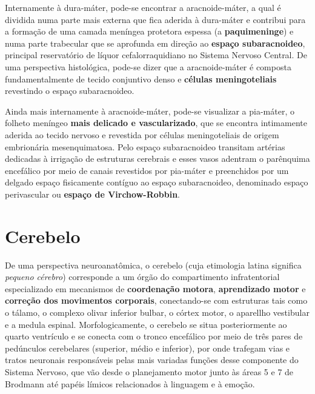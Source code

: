 \documentclass[
]{book}
\begin{document}
Internamente à dura-máter, pode-se encontrar a aracnoide-máter, a qual é dividida numa parte mais externa que fica aderida à dura-máter e contribui para a formação de uma camada meníngea protetora espessa (a \textbf{paquimeninge}) e numa parte trabecular que se aprofunda em direção ao \textbf{espaço subaracnoideo}, principal reservatório de líquor cefalorraquidiano no Sistema Nervoso Central. De uma perspectiva histológica, pode-se dizer que a aracnoide-máter é composta fundamentalmente de tecido conjuntivo denso e \textbf{células meningoteliais} revestindo o espaço subaracnoideo.

Ainda mais internamente à aracnoide-máter, pode-se visualizar a pia-máter, o folheto meníngeo \textbf{mais delicado e vascularizado}, que se encontra intimamente aderida ao tecido nervoso e revestida por células meningoteliais de origem embrionária mesenquimatosa. Pelo espaço subaracnoideo transitam artérias dedicadas à irrigação de estruturas cerebrais e esses vasos adentram o parênquima encefálico por meio de canais revestidos por pia-máter e preenchidos por um delgado espaço fisicamente contíguo ao espaço subaracnoideo, denominado espaço perivascular ou \textbf{espaço de Virchow-Robbin}.

\hypertarget{cerebelo}{%
\chapter{Cerebelo}\label{cerebelo}}

De uma perspectiva neuroanatômica, o cerebelo (cuja etimologia latina significa \emph{pequeno cérebro}) corresponde a um órgão do compartimento infratentorial especializado em mecanismos de \textbf{coordenação motora}, \textbf{aprendizado motor} e \textbf{correção dos movimentos corporais}, conectando-se com estruturas tais como o tálamo, o complexo olivar inferior bulbar, o córtex motor, o aparellho vestibular e a medula espinal. Morfologicamente, o cerebelo se situa posteriormente ao quarto ventrículo e se conecta com o tronco encefálico por meio de três pares de pedúnculos cerebelares (superior, médio e inferior), por onde trafegam vias e tratos neuronais responsáveis pelas mais variadas funções desse componente do Sistema Nervoso, que vão desde o planejamento motor junto às áreas 5 e 7 de Brodmann até papéis límicos relacionados à linguagem e à emoção.
\end{document}
